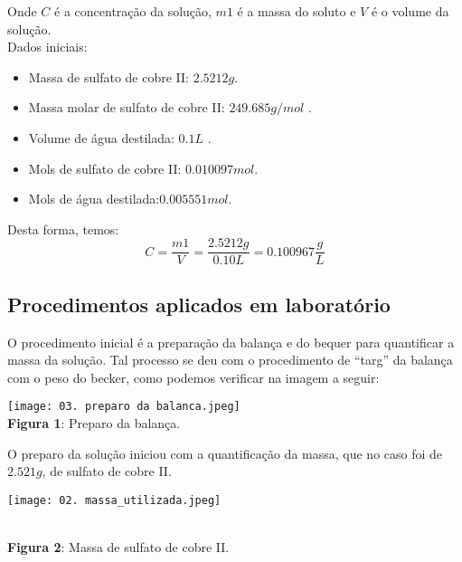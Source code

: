\documentclass[a4paper, 11pt]{article}
\begin{document}
    \indent Onde $C$ é a concentração da solução, $m1$ é a massa do soluto e $V$ é o volume da solução\@.\\

    \indent Dados iniciais:
    \begin{itemize}
        \item Massa de sulfato de cobre II: $2.5212g$\@.
        \item Massa molar de sulfato de cobre II: $249.685 g/mol$ \@.
        \item Volume de água destilada: $0.1L$ \@.
        \item Mols de sulfato de cobre II: $0.010097mol$\@.
        \item Mols de água destilada:$0.005551mol$\@.
    \end{itemize}

    \indent Desta forma, temos:
    \begin{equation}
        \label{eq:equacao_concentracao}
        C = \frac{m1}{V}
        = \frac{2.5212g}{0.10L}
        = 0.100967\frac{g}{L}
    \end{equation}

    \subsection{Procedimentos aplicados em laboratório}\label{sec:procedimentos_laboratorio}
    \indent O procedimento inicial é a preparação da balança e do bequer para quantificar a massa da solução\@. Tal processo
    se deu com o procedimento de ``targ'' da balança com o peso do becker, como podemos verificar na imagem a seguir\@: \\
    \begin{center}
        \texttt{[image: 03. preparo da balanca.jpeg]}\\
        \singlespacing
        \textbf{Figura 1}: Preparo da balança\@.
    \end{center}
    \doublespacing

    \indent O preparo da solução iniciou com a quantificação da massa, que no caso foi de $2.521g$, de sulfato de cobre II\@.\\
    \begin{center}
        \parbox{7cm}{\texttt{[image: 02. massa\_utilizada.jpeg]}}\\
        \singlespacing
        \textbf{Figura 2}: Massa de sulfato de cobre II\@.
    \end{center}
    \doublespacing
\end{document}
